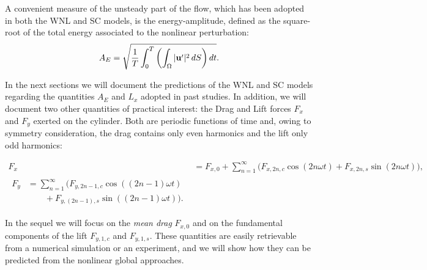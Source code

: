 \documentclass[twocolumn,10pt]{asme2ej}
\newcommand{\be}[1]{ \begin{equation} \label{#1}}
\newcommand{\ee}{\end{equation}}
\begin{document}
A convenient measure of the unsteady part of the flow, which has been adopted in both the WNL and SC models, is the energy-amplitude, defined as the square-root of the total energy associated to the nonlinear perturbation:
\be{defAnergy}
A_E = \sqrt{\frac{1}{T} \int_0^{T} \left( \int_\Omega | {\bf u}' |^2 \, dS \right) dt}.
\ee

In the next sections we will document the predictions of the WNL and SC models regarding the quantities $A_E$ and $L_x$ adopted in past studies.
In addition, we will document two other quantities of practical interest: the Drag and Lift forces $F_x$ and $F_y$ exerted on the cylinder. 
Both are periodic functions of time and, owing to symmetry consideration, the drag contains only even harmonics and the lift only odd harmonics:

\begin{align}
F_x &=F_{x,0} + \sum_{n=1}^\infty \big( F_{x,2n,c} \cos ( 2 n \omega t) + F_{x,2n,s} \sin( 2 n  \omega t ) \big),
\\
\begin{split}
F_y  & =\sum_{n=1}^\infty \big( F_{y,{2n-1},c} \cos ((2n-1) \omega t )\\
             &\qquad + F_{y,(2n-1),s}  \sin ((2n-1) \omega t) \big).
\end{split}
\label{drag_lift_def}
\end{align}



In the sequel we will focus on the {\em mean drag}  $F_{x,0}$ and on the fundamental components of the lift  
$F_{y,1,c}$ and $F_{y,1,s}$. These quantities are easily retrievable from a numerical simulation or an experiment, and we will show how they can be predicted from the nonlinear global approaches.
 
  

   

\end{document}

